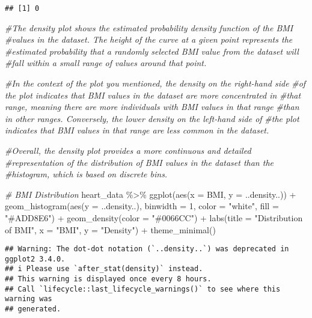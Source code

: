 \documentclass[
]{article}
\newenvironment{Shaded}{\begin{snugshade}}{\end{snugshade}}
\newcommand{\AttributeTok}[1]{\textcolor[rgb]{0.77,0.63,0.00}{#1}}
\newcommand{\CommentTok}[1]{\textcolor[rgb]{0.56,0.35,0.01}{\textit{#1}}}
\newcommand{\DecValTok}[1]{\textcolor[rgb]{0.00,0.00,0.81}{#1}}
\newcommand{\FunctionTok}[1]{\textcolor[rgb]{0.00,0.00,0.00}{#1}}
\newcommand{\NormalTok}[1]{#1}
\newcommand{\SpecialCharTok}[1]{\textcolor[rgb]{0.00,0.00,0.00}{#1}}
\newcommand{\StringTok}[1]{\textcolor[rgb]{0.31,0.60,0.02}{#1}}
\begin{document}
\begin{verbatim}
## [1] 0
\end{verbatim}

\begin{Shaded}
\begin{Highlighting}[]
\CommentTok{\#The density plot shows the estimated probability density function of the BMI }
\CommentTok{\#values in the dataset. The height of the curve at a given point represents the}
\CommentTok{\#estimated probability that a randomly selected BMI value from the dataset will }
\CommentTok{\#fall within a small range of values around that point.}

\CommentTok{\#In the context of the plot you mentioned, the density on the right{-}hand side }
\CommentTok{\#of the plot indicates that BMI values in the dataset are more concentrated in }
\CommentTok{\#that range, meaning there are more individuals with BMI values in that range }
\CommentTok{\#than in other ranges. Conversely, the lower density on the left{-}hand side of }
\CommentTok{\#the plot indicates that BMI values in that range are less common in the dataset.}

\CommentTok{\#Overall, the density plot provides a more continuous and detailed }
\CommentTok{\#representation of the distribution of BMI values in the dataset than the }
\CommentTok{\#histogram, which is based on discrete bins.}


\CommentTok{\# BMI Distribution}
\NormalTok{heart\_data }\SpecialCharTok{\%\textgreater{}\%} 
  \FunctionTok{ggplot}\NormalTok{(}\FunctionTok{aes}\NormalTok{(}\AttributeTok{x =}\NormalTok{ BMI, }\AttributeTok{y =}\NormalTok{ ..density..)) }\SpecialCharTok{+}
  \FunctionTok{geom\_histogram}\NormalTok{(}\FunctionTok{aes}\NormalTok{(}\AttributeTok{y =}\NormalTok{ ..density..), }\AttributeTok{binwidth =} \DecValTok{1}\NormalTok{, }\AttributeTok{color =} \StringTok{"white"}\NormalTok{, }\AttributeTok{fill =} \StringTok{"\#ADD8E6"}\NormalTok{) }\SpecialCharTok{+}
  \FunctionTok{geom\_density}\NormalTok{(}\AttributeTok{color =} \StringTok{"\#0066CC"}\NormalTok{) }\SpecialCharTok{+}
  \FunctionTok{labs}\NormalTok{(}\AttributeTok{title =} \StringTok{"Distribution of BMI"}\NormalTok{, }\AttributeTok{x =} \StringTok{"BMI"}\NormalTok{, }\AttributeTok{y =} \StringTok{"Density"}\NormalTok{) }\SpecialCharTok{+}
  \FunctionTok{theme\_minimal}\NormalTok{()}
\end{Highlighting}
\end{Shaded}

\begin{verbatim}
## Warning: The dot-dot notation (`..density..`) was deprecated in ggplot2 3.4.0.
## i Please use `after_stat(density)` instead.
## This warning is displayed once every 8 hours.
## Call `lifecycle::last_lifecycle_warnings()` to see where this warning was
## generated.
\end{verbatim}
\end{document}
